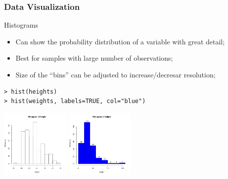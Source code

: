 \documentclass[10pt]{beamer}
\begin{document}
\begin{frame}
  \frametitle{Data Visualization}
    \begin{block}{Histograms}
      {\small
        \begin{itemize}
        \item Can show the probability distribution of a variable with
          great detail;
        \item Best for samples with large number of observations;
        \item Size of the ``bins'' can be adjusted to increase/decresar
          resolution;
      \end{itemize}}
    \end{block}
    \small{
\begin{verbatim}
> hist(heights)
> hist(weights, labels=TRUE, col="blue")
\end{verbatim}}
\medskip

\begin{center}
  \includegraphics[width=0.25\textwidth]{img/hist01}\hspace{0.2\textwidth}
  \includegraphics[width=0.25\textwidth]{img/hist02}
\end{center}
\end{frame}
\end{document}
